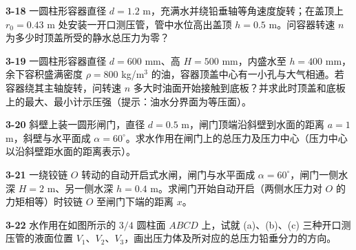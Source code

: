 \begin{ti}
\item[\textbf{3-18}] 一圆柱形容器直径 $d=1.2$ m，充满水并绕铅垂轴等角速度旋转；在盖顶上 $r_0=0.43$ m 处安装一开口测压管，管中水位高出盖顶 $h=0.5$ m。问容器转速 $n$ 为多少时顶盖所受的静水总压力为零？
\quad{}\quad{}

\item[\textbf{3-19}] 一圆柱形容器直径 $d=600$ mm、高 $H=500$ mm，内盛水至 $h=400$ mm，余下容积盛满密度 $\rho=800$ kg/m$^3$ 的油，容器顶盖中心有一小孔与大气相通。若容器绕其主轴旋转，问转速 $n$ 多大时油面开始接触到底板？并求此时顶盖和底板上的最大、最小计示压强（提示：油水分界面为等压面）。
\quad{}\quad{}

\item[\textbf{3-20}] 斜壁上装一圆形闸门，直径 $d=0.5$ m，闸门顶端沿斜壁到水面的距离 $a=1$ m，斜壁与水平面成 $\alpha=60^\circ$。求水作用在闸门上的总压力及压力中心（压力中心以沿斜壁距水面的距离表示）。
\quad{}\quad{}

\item[\textbf{3-21}] 一绕铰链 $O$ 转动的自动开启式水闸，闸门与水平面成 $\alpha=60^\circ$，闸门一侧水深 $H=2$ m、另一侧水深 $h=0.4$ m。求闸门开始自动开启（两侧水压力对 $O$ 的力矩相等）时铰链 $O$ 至闸门下端的距离 $x$。
\quad{}\quad{}

\item[\textbf{3-22}] 水作用在如图所示的 $3/4$ 圆柱面 $ABCD$ 上，试就 (a)、(b)、(c) 三种开口测压管的液面位置 $V_1$、$V_2$、$V_3$，画出压力体及所对应的总压力铅垂分力的方向。
\quad{}\quad{}


\end{ti}
